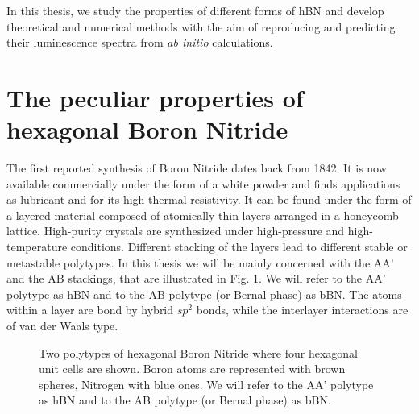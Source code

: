 In this thesis, we study the properties of different forms of \acrshort{hBN} and develop theoretical and numerical methods with the aim of reproducing and predicting their luminescence spectra from \textit{ab initio} calculations.


\section*{The peculiar properties of hexagonal Boron Nitride}
The first reported synthesis of Boron Nitride dates back from 1842.\cite{balmain1842xlvi} It is now available commercially under the form of a white powder and finds applications as lubricant and for its high thermal resistivity. It can be found under the form of a layered material composed of atomically thin layers arranged in a honeycomb lattice. High-purity crystals are synthesized under high-pressure and high-temperature conditions.\cite{watanabe2004direct} 
Different stacking of the layers lead to different stable or metastable polytypes. In this thesis we will be mainly concerned with the AA' and the AB stackings, that are illustrated in Fig. \ref{fig:hBN_stackings}. We will refer to the AA' polytype as hBN and to the AB polytype (or Bernal phase) as bBN. The atoms within a layer are bond by hybrid $sp^2$ bonds, while the interlayer interactions are of van der Waals type.
\begin{figure}[h!t]%
	\vspace{0.2cm}
	\setcapindent{2em}
	\centering
     \qquad
    \caption{Two polytypes of hexagonal Boron Nitride where four hexagonal unit cells are shown. Boron atoms are represented with brown spheres, Nitrogen with blue ones. We will refer to the AA' polytype as hBN and to the AB polytype (or Bernal phase) as bBN.}
	\label{fig:hBN_stackings}
\end{figure}
%
